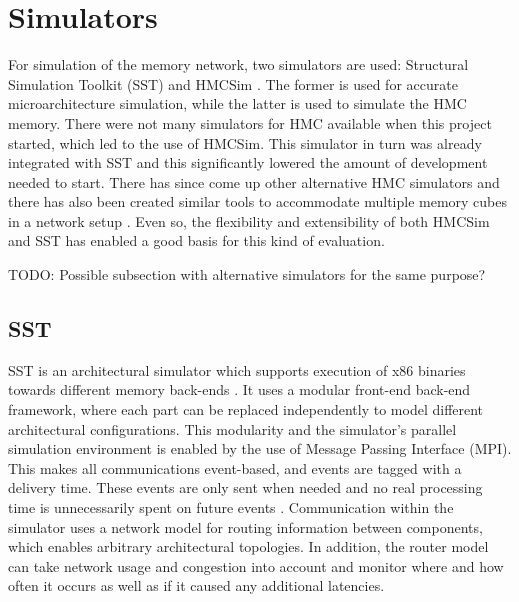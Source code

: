 \section{Simulators}
For simulation of the memory network, two simulators are used: Structural Simulation Toolkit (SST) \cite{rodrigues2011structural} and HMCSim \cite{6969550}. The former is used for accurate microarchitecture simulation, while the latter is used to simulate the HMC memory. There were not many simulators for HMC available when this project started, which led to the use of HMCSim. This simulator in turn was already integrated with SST and this significantly lowered the amount of development needed to start. There has since come up other alternative HMC simulators \cite{7544479, Yang:2018:HCH:3240302.3240319} and there has also been created similar tools to accommodate multiple memory cubes in a network setup \cite{Siegl:2017:BAF:3132402.3132403}. Even so, the flexibility and extensibility of both HMCSim and SST has enabled a good basis for this kind of evaluation.
\bigskip

TODO: Possible subsection with alternative simulators for the same purpose?

\subsection{SST}
SST is an architectural simulator which supports execution of x86 binaries towards different memory back-ends \cite{rodrigues2011structural}. It uses a modular front-end back-end framework, where each part can be replaced independently to model different architectural configurations. This modularity and the simulator's parallel simulation environment is enabled by the use of Message Passing Interface (MPI). This makes all communications event-based, and events are tagged with a delivery time. These events are only sent when needed and no real processing time is unnecessarily spent on future events \cite{11.1093/comjnl/bxr069}. Communication within the simulator uses a network model for routing information between components, which enables arbitrary architectural topologies. In addition, the router model can take network usage and congestion into account and monitor where and how often it occurs as well as if it caused any additional latencies.
\bigskip

